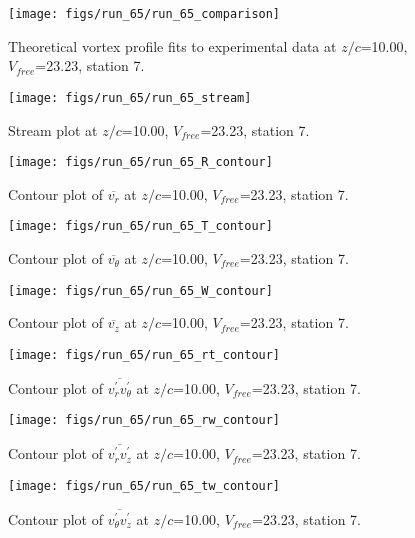 \begin{figure}[H]
\centering
\texttt{[image: figs/run\_65/run\_65\_comparison]}
\caption{Theoretical vortex profile fits to experimental data at $z/c$=10.00, $V_{free}$=23.23, station 7.}
\end{figure}


\begin{figure}[H]
\centering
\texttt{[image: figs/run\_65/run\_65\_stream]}
\caption{Stream plot at $z/c$=10.00, $V_{free}$=23.23, station 7.}
\end{figure}


\begin{figure}[H]
\centering
\texttt{[image: figs/run\_65/run\_65\_R\_contour]}
\caption{Contour plot of $\overline{v_{r}}$ at $z/c$=10.00, $V_{free}$=23.23, station 7.}
\end{figure}


\begin{figure}[H]
\centering
\texttt{[image: figs/run\_65/run\_65\_T\_contour]}
\caption{Contour plot of $\overline{v_{\theta}}$ at $z/c$=10.00, $V_{free}$=23.23, station 7.}
\end{figure}


\begin{figure}[H]
\centering
\texttt{[image: figs/run\_65/run\_65\_W\_contour]}
\caption{Contour plot of $\overline{v_{z}}$ at $z/c$=10.00, $V_{free}$=23.23, station 7.}
\end{figure}


\begin{figure}[H]
\centering
\texttt{[image: figs/run\_65/run\_65\_rt\_contour]}
\caption{Contour plot of $\overline{v_{r}^{\prime} v_{\theta}^{\prime}}$ at $z/c$=10.00, $V_{free}$=23.23, station 7.}
\end{figure}


\begin{figure}[H]
\centering
\texttt{[image: figs/run\_65/run\_65\_rw\_contour]}
\caption{Contour plot of $\overline{v_{r}^{\prime} v_{z}^{\prime}}$ at $z/c$=10.00, $V_{free}$=23.23, station 7.}
\end{figure}


\begin{figure}[H]
\centering
\texttt{[image: figs/run\_65/run\_65\_tw\_contour]}
\caption{Contour plot of $\overline{v_{\theta}^{\prime} v_{z}^{\prime}}$ at $z/c$=10.00, $V_{free}$=23.23, station 7.}
\end{figure}


